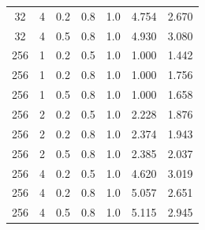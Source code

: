 \begin{table}
\begin{tabular}{|c|c|c|c|c|c|c|}
     32 &       4 & 0.2 & 0.8 &            1.0 &          4.754 &               2.670 \\
     32 &       4 & 0.5 & 0.8 &            1.0 &          4.930 &               3.080 \\
    256 &       1 & 0.2 & 0.5 &            1.0 &          1.000 &               1.442 \\
    256 &       1 & 0.2 & 0.8 &            1.0 &          1.000 &               1.756 \\
    256 &       1 & 0.5 & 0.8 &            1.0 &          1.000 &               1.658 \\
    256 &       2 & 0.2 & 0.5 &            1.0 &          2.228 &               1.876 \\
    256 &       2 & 0.2 & 0.8 &            1.0 &          2.374 &               1.943 \\
    256 &       2 & 0.5 & 0.8 &            1.0 &          2.385 &               2.037 \\
    256 &       4 & 0.2 & 0.5 &            1.0 &          4.620 &               3.019 \\
    256 &       4 & 0.2 & 0.8 &            1.0 &          5.057 &               2.651 \\
    256 &       4 & 0.5 & 0.8 &            1.0 &          5.115 &               2.945 \\
\bottomrule
\end{tabular}
\end{table}

\newpage

